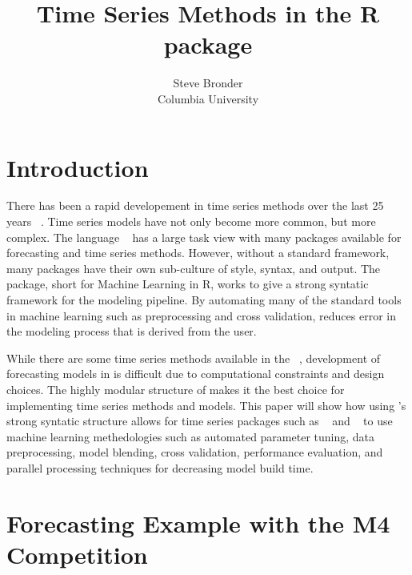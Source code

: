 \documentclass[article]{jss}\usepackage[]{graphicx}\usepackage[]{color}
\author{Steve Bronder\\ Columbia University}
\title{Time Series Methods in the R package \pkg{MLR}}
\begin{document}

\section{Introduction}

There has been a rapid developement in time series methods over the last 25 years ~\cite{Hyndman25}. Time series models have not only become more common, but more complex. The  language ~\cite{Rbase} has a large task view with many packages available for forecasting and time series methods. However, without a standard framework, many packages have their own sub-culture of style, syntax, and output. The  ~\cite{mlr} package, short for Machine Learning in R, works to give a strong syntatic framework for the modeling pipeline. By automating many of the standard tools in machine learning such as preprocessing and cross validation,  reduces error in the modeling process that is derived from the user. 

While there are some time series methods available in the  ~\cite{caret}, development of forecasting models in  is difficult due to computational constraints and design choices. The highly modular structure of  makes it the best choice for implementing time series methods and models. This paper will show how using 's strong syntatic structure allows for time series packages such as  ~\cite{HyndForecast} and  ~\cite{rugarch} to use machine learning methedologies such as automated parameter tuning, data preprocessing, model blending, cross validation, performance evaluation, and parallel processing techniques for decreasing model build time.

\section{Forecasting Example with the M4 Competition}
\end{document}
